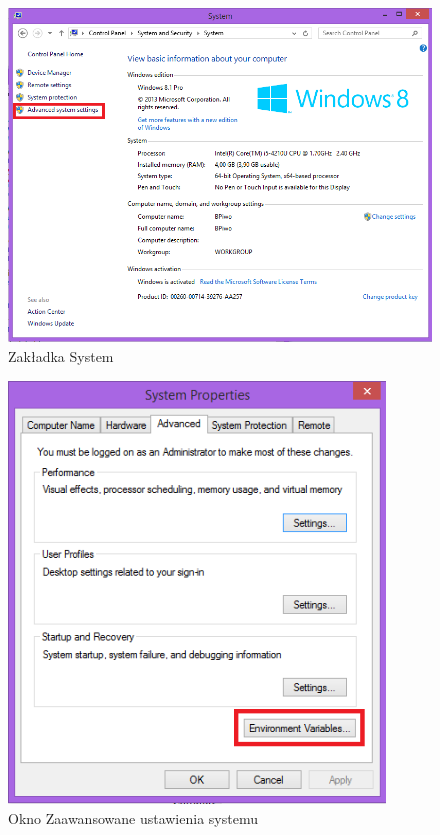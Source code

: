 \begin{figure}[h]
\centering
\includegraphics[width=14cm]{Zdjecia/5/anaconda3}
\caption{Zakładka System}
\label{fig:anaconda3}
\end{figure}

\begin{figure}[h]
\centering
\includegraphics[width=10cm]{Zdjecia/5/anaconda4}
\caption{Okno Zaawansowane ustawienia systemu}
\label{fig:anaconda4}
\end{figure}

